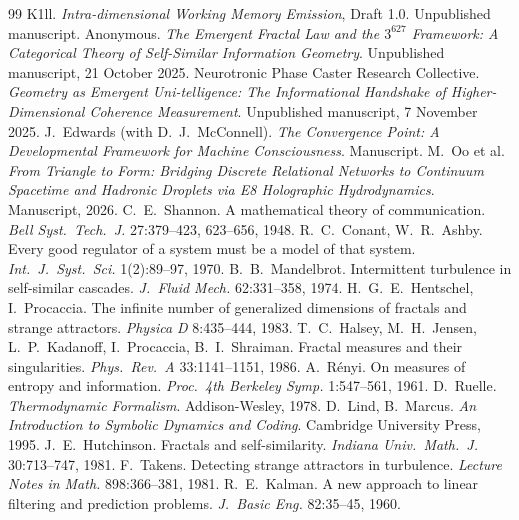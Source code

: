 \documentclass[11pt]{article}
\theoremstyle{definition}
\theoremstyle{remark}
\begin{document}
\begin{thebibliography}{99}\footnotesize\setlength{\itemsep}{0.4pt plus 0.4pt}\setlength{\parskip}{0pt}
 K1ll. \emph{Intra-dimensional Working Memory Emission}, Draft 1.0. Unpublished manuscript.
 Anonymous. \emph{The Emergent Fractal Law and the $3^{627}$ Framework: A Categorical Theory of Self-Similar Information Geometry}. Unpublished manuscript, 21 October 2025.
 Neurotronic Phase Caster Research Collective. \emph{Geometry as Emergent Uni-telligence: The Informational Handshake of Higher-Dimensional Coherence Measurement}. Unpublished manuscript, 7 November 2025.
 J.\ Edwards (with D.\ J.\ McConnell). \emph{The Convergence Point: A Developmental Framework for Machine Consciousness}. Manuscript.
 M.\ Oo et al. \emph{From Triangle to Form: Bridging Discrete Relational Networks to Continuum Spacetime and Hadronic Droplets via E8 Holographic Hydrodynamics}. Manuscript, 2026.
 C.\ E.\ Shannon. A mathematical theory of communication. \emph{Bell Syst.\ Tech.\ J.} 27:379--423, 623--656, 1948.
 R.\ C.\ Conant, W.\ R.\ Ashby. Every good regulator of a system must be a model of that system. \emph{Int.\ J.\ Syst.\ Sci.} 1(2):89--97, 1970.
 B.\ B.\ Mandelbrot. Intermittent turbulence in self-similar cascades. \emph{J.\ Fluid Mech.} 62:331--358, 1974.
 H.\ G.\ E.\ Hentschel, I.\ Procaccia. The infinite number of generalized dimensions of fractals and strange attractors. \emph{Physica D} 8:435--444, 1983.
 T.\ C.\ Halsey, M.\ H.\ Jensen, L.\ P.\ Kadanoff, I.\ Procaccia, B.\ I.\ Shraiman. Fractal measures and their singularities. \emph{Phys.\ Rev.\ A} 33:1141--1151, 1986.
 A.\ Rényi. On measures of entropy and information. \emph{Proc.\ 4th Berkeley Symp.} 1:547--561, 1961.
 D.\ Ruelle. \emph{Thermodynamic Formalism}. Addison-Wesley, 1978.
 D.\ Lind, B.\ Marcus. \emph{An Introduction to Symbolic Dynamics and Coding}. Cambridge University Press, 1995.
 J.\ E.\ Hutchinson. Fractals and self-similarity. \emph{Indiana Univ.\ Math.\ J.} 30:713--747, 1981.
 F.\ Takens. Detecting strange attractors in turbulence. \emph{Lecture Notes in Math.} 898:366--381, 1981.
 R.\ E.\ Kalman. A new approach to linear filtering and prediction problems. \emph{J.\ Basic Eng.} 82:35--45, 1960.

\end{thebibliography}
\end{document}
